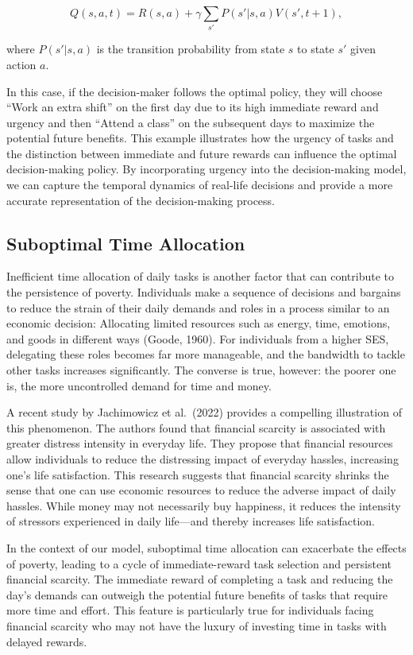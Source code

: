 \documentclass[
]{report}
\begin{document}
\[Q(s, a, t) = R(s, a) + \gamma \sum_{s'} P(s' | s, a) V(s', t+1),\]

where \(P(s' | s, a)\) is the transition probability from state \(s\) to
state \(s'\) given action \(a\).

In this case, if the decision-maker follows the optimal policy, they
will choose ``Work an extra shift'' on the first day due to its high
immediate reward and urgency and then ``Attend a class'' on the
subsequent days to maximize the potential future benefits. This example
illustrates how the urgency of tasks and the distinction between
immediate and future rewards can influence the optimal decision-making
policy. By incorporating urgency into the decision-making model, we can
capture the temporal dynamics of real-life decisions and provide a more
accurate representation of the decision-making process.

\hypertarget{suboptimal-time-allocation}{%
\subsection{Suboptimal Time
Allocation}\label{suboptimal-time-allocation}}

Inefficient time allocation of daily tasks is another factor that can
contribute to the persistence of poverty. Individuals make a sequence of
decisions and bargains to reduce the strain of their daily demands and
roles in a process similar to an economic decision: Allocating limited
resources such as energy, time, emotions, and goods in different ways
(Goode, 1960). For individuals from a higher SES, delegating these roles
becomes far more manageable, and the bandwidth to tackle other tasks
increases significantly. The converse is true, however: the poorer one
is, the more uncontrolled demand for time and money.

A recent study by Jachimowicz et al.~(2022) provides a compelling
illustration of this phenomenon. The authors found that financial
scarcity is associated with greater distress intensity in everyday life.
They propose that financial resources allow individuals to reduce the
distressing impact of everyday hassles, increasing one's life
satisfaction. This research suggests that financial scarcity shrinks the
sense that one can use economic resources to reduce the adverse impact
of daily hassles. While money may not necessarily buy happiness, it
reduces the intensity of stressors experienced in daily life---and
thereby increases life satisfaction.

In the context of our model, suboptimal time allocation can exacerbate
the effects of poverty, leading to a cycle of immediate-reward task
selection and persistent financial scarcity. The immediate reward of
completing a task and reducing the day's demands can outweigh the
potential future benefits of tasks that require more time and effort.
This feature is particularly true for individuals facing financial
scarcity who may not have the luxury of investing time in tasks with
delayed rewards.
\end{document}
